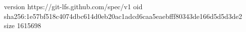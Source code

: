 version https://git-lfs.github.com/spec/v1
oid sha256:1e57bf518c4074dbc614d0eb20ac1adcd6caa5eaebfff80343de166d5d5d3de2
size 1615698
